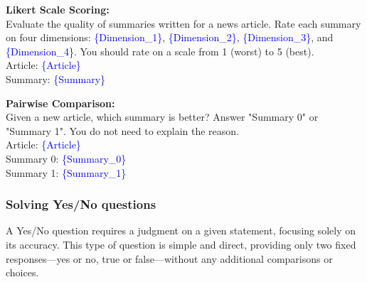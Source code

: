 \documentclass[acmsmall,screen]{acmart}
\begin{document}
\begin{tcolorbox}[colback=gray!10, colframe=gray!90!black, title={Evaluation Prompt Templates from \citet{human_like_summarization}}]
\textbf{Likert Scale Scoring:}\\
Evaluate the quality of summaries written for a news article. Rate each summary on four dimensions: \textcolor{blue}{\{Dimension\_1\}}, \textcolor{blue}{\{Dimension\_2\}}, \textcolor{blue}{\{Dimension\_3\}}, and \textcolor{blue}{\{Dimension\_4\}}. You should rate on a scale from 1 (worst) to 5 (best).\\
Article: \textcolor{blue}{\{Article\}} \\
Summary: \textcolor{blue}{\{Summary\}}

\vspace{6pt}
\textbf{Pairwise Comparison:}\\
Given a new article, which summary is better? Answer "Summary 0" or "Summary 1". You do not need to explain the reason.\\
Article: \textcolor{blue}{\{Article\}} \\
Summary 0: \textcolor{blue}{\{Summary\_0\}} \\
Summary 1: \textcolor{blue}{\{Summary\_1\}}
\end{tcolorbox}






\subsubsection{\textbf{Solving Yes/No questions}}




A Yes/No question requires a judgment on a given statement, focusing solely on its accuracy. This type of question is simple and direct, providing only two fixed responses—yes or no, true or false—without any additional comparisons or choices. 


\end{document}
